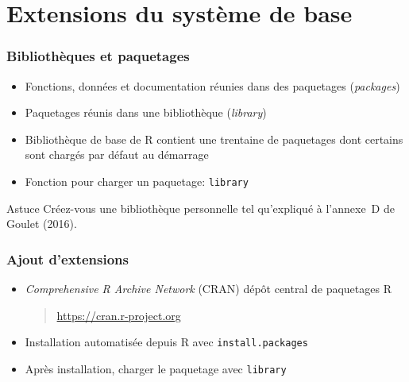 \section{Extensions du système de base}

\begin{frame}[fragile=singleslide]
  \frametitle{Bibliothèques et paquetages}

  \begin{itemize}
  \item Fonctions, données et documentation réunies dans des
    \alert{paquetages} (\emph{packages})
  \item Paquetages réunis dans une \alert{bibliothèque}
    (\emph{library})
  \item Bibliothèque de base de R contient une trentaine de paquetages
    dont certains sont chargés par défaut au démarrage
  \item Fonction pour charger un paquetage: \texttt{library}
  \end{itemize}

  \begin{alertblock}{Astuce}
    Créez-vous une bibliothèque personnelle tel qu'expliqué à
    l'annexe~D de Goulet (2016).
  \end{alertblock}
\end{frame}

\begin{frame}[fragile=singleslide]
  \frametitle{Ajout d'extensions}

  \begin{itemize}
  \item \emph{Comprehensive R Archive Network} (CRAN) dépôt central de
    paquetages R
    \begin{quote}
      \url{https://cran.r-project.org}
    \end{quote}
  \item Installation automatisée depuis R avec
    \texttt{install.packages}
  \item Après installation, charger le paquetage avec \texttt{library}
  \end{itemize}

  \pause
\end{frame}


